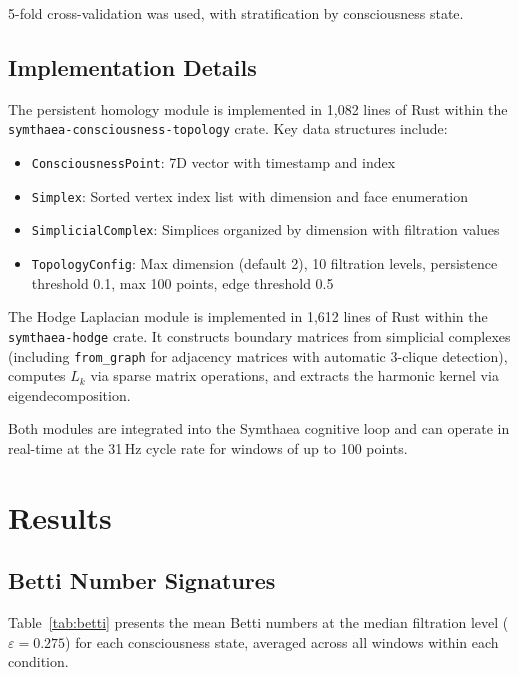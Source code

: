 \documentclass[11pt,a4paper]{article}
\begin{document}
5-fold cross-validation was used, with stratification by consciousness state.

\subsection{Implementation Details}

The persistent homology module is implemented in 1,082 lines of Rust within the \texttt{symthaea-consciousness-topology} crate.
Key data structures include:
\begin{itemize}
  \item \texttt{ConsciousnessPoint}: 7D vector with timestamp and index
  \item \texttt{Simplex}: Sorted vertex index list with dimension and face enumeration
  \item \texttt{SimplicialComplex}: Simplices organized by dimension with filtration values
  \item \texttt{TopologyConfig}: Max dimension (default 2), 10 filtration levels, persistence threshold 0.1, max 100 points, edge threshold 0.5
\end{itemize}

The Hodge Laplacian module is implemented in 1,612 lines of Rust within the \texttt{symthaea-hodge} crate.
It constructs boundary matrices from simplicial complexes (including \texttt{from\_graph} for adjacency matrices with automatic 3-clique detection), computes $L_k$ via sparse matrix operations, and extracts the harmonic kernel via eigendecomposition.

Both modules are integrated into the Symthaea cognitive loop and can operate in real-time at the 31\,Hz cycle rate for windows of up to 100 points.

\section{Results}
\label{sec:results}

\subsection{Betti Number Signatures}

Table~\ref{tab:betti} presents the mean Betti numbers at the median filtration level ($\varepsilon = 0.275$) for each consciousness state, averaged across all windows within each condition.
\end{document}

